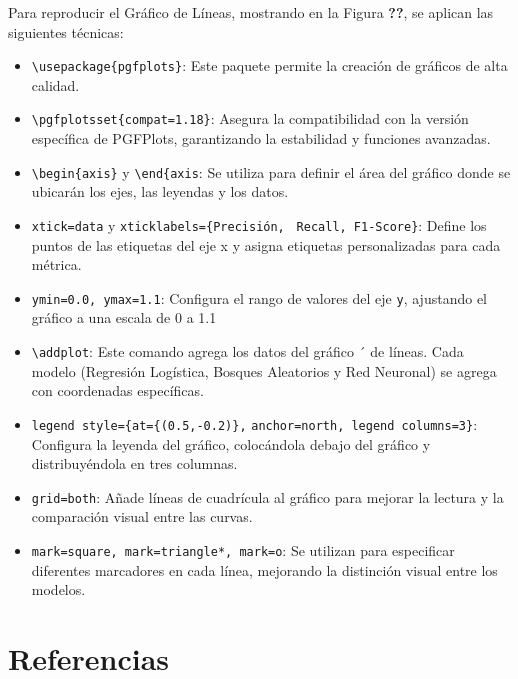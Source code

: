 \documentclass[conference]{IEEEtran}
\begin{document}
            
            Para reproducir el Gráfico de Líneas, mostrando en la Figura \textbf{??}, se aplican  las siguientes técnicas:
            \begin{itemize}
                \item \verb|\usepackage{pgfplots}|: Este paquete permite la creación de gráficos de alta calidad.
                \item \verb|\pgfplotsset{compat=1.18}|: Asegura la compatibilidad con la versión específica de PGFPlots, garantizando la estabilidad y funciones avanzadas.
                \item \verb|\begin{axis}| y \verb|\end{axis|: Se utiliza para definir el área del gráfico donde se ubicarán los ejes, las leyendas y los datos.
                \item \verb|xtick=data| y  \verb|xticklabels={Precisión,|
                \verb| Recall, F1-Score}|: Define los puntos de las etiquetas del eje x y asigna etiquetas personalizadas para cada métrica.
                \item \verb|ymin=0.0, ymax=1.1|: Configura el rango de valores del eje \verb|y|, ajustando el gráfico a una escala de 0 a 1.1
                \item \verb|\addplot|:  Este comando agrega los datos del gráfico ´
                de líneas. Cada modelo (Regresión Logística, Bosques
                Aleatorios y Red Neuronal) se agrega con coordenadas
                específicas.
                \item \verb|legend style={at={(0.5,-0.2)},| 
                \verb|anchor=north, legend columns=3}|: Configura la leyenda del gráfico, colocándola debajo del gráfico y distribuyéndola en tres columnas.
                \item \verb|grid=both|: Añade líneas de cuadrícula al gráfico para mejorar la lectura y la comparación visual entre las curvas.
                \item \verb|mark=square, mark=triangle*, mark=o|: Se utilizan para especificar diferentes marcadores en cada línea,
                mejorando la distinción visual entre los modelos. 
            \end{itemize}
        
        \section{Referencias}
        
        
\end{document}
